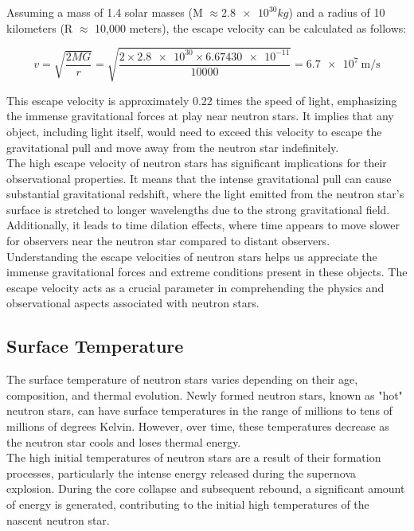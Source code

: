 \noindent
Assuming a mass of 1.4 solar masses (M $\approx \num{2.8e30} kg$) and a radius of 10 kilometers (R $\approx$ 10,000 meters), the escape velocity can be calculated as follows:

\begin{equation*}
    v = \sqrt{\frac{2 M G}{r}}
    = \sqrt{\frac{2 \times \num{2.8e30} \times \num{6.67430e-11}}{10000}}
    = \SI{6.7e7}{\metre/\second}
\end{equation*}

This escape velocity is approximately 0.22 times the speed of light, emphasizing the immense gravitational forces at play near neutron stars. It implies that any object, including light itself, would need to exceed this velocity to escape the gravitational pull and move away from the neutron star indefinitely.\\

\newpage
The high escape velocity of neutron stars has significant implications for their observational properties. It means that the intense gravitational pull can cause substantial gravitational redshift, where the light emitted from the neutron star's surface is stretched to longer wavelengths due to the strong gravitational field. Additionally, it leads to time dilation effects, where time appears to move slower for observers near the neutron star compared to distant observers.\\

Understanding the escape velocities of neutron stars helps us appreciate the immense gravitational forces and extreme conditions present in these objects. The escape velocity acts as a crucial parameter in comprehending the physics and observational aspects associated with neutron stars.

\subsection{Surface Temperature}

The surface temperature of neutron stars varies depending on their age, composition, and thermal evolution. Newly formed neutron stars, known as "hot" neutron stars, can have surface temperatures in the range of millions to tens of millions of degrees Kelvin. However, over time, these temperatures decrease as the neutron star cools and loses thermal energy.\\

The high initial temperatures of neutron stars are a result of their formation processes, particularly the intense energy released during the supernova explosion. During the core collapse and subsequent rebound, a significant amount of energy is generated, contributing to the initial high temperatures of the nascent neutron star.\\

